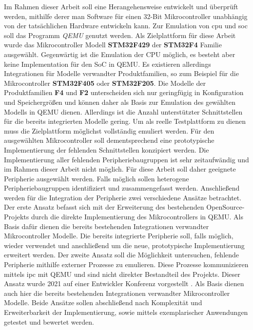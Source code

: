 Im Rahmen dieser Arbeit soll eine Herangehensweise entwickelt und überprüft
werden, mithilfe derer man Software für einen 32-Bit Mikrocontroller unabhängig
von der tatsächlichen Hardware entwickeln kann.
Zur Emulation von \acs{cpu} und \acs{soc} soll das Programm \textit{QEMU}
genutzt werden.
Als Zielplattform für diese Arbeit wurde das Mikrocontroller Modell
\textbf{STM32F429} der \textbf{STM32F4} Familie ausgewählt.
Gegenwärtig ist die Emulation der CPU möglich, es besteht aber keine
Implementation für den SoC in QEMU.
Es existieren allerdings Integrationen für Modelle verwandter Produktfamilien,
so zum Beispiel für die Mikrocontroller \textbf{STM32F405} oder
\textbf{STM32F205}\cite{QemuSTMDoku}.
Die Modelle der Produktfamilien \textbf{F4} und \textbf{F2} unterscheiden sich
nur geringfügig in Konfiguration und Speichergrößen und können daher als Basis
zur Emulation des gewählten Modells in QEMU dienen.
Allerdings ist die Anzahl unterstützter Schnittstellen für die bereits
integrierten Modelle gering.
Um als reelle Testplattform zu dienen muss die Zielplattform möglichst
vollständig emuliert werden.\newline
Für den ausgewählten Mikrocontroller soll dementsprechend eine prototypische
Implementierung der fehlenden Schnittstellen konzipiert werden.
Die Implementierung aller fehlenden Peripheriebaugruppen ist sehr zeitaufwändig
und im Rahmen dieser Arbeit nicht möglich.
Für diese Arbeit soll daher geeignete Peripherie ausgewählt werden.
Falls möglich sollen heterogene Peripheriebaugruppen identifiziert und
zusammengefasst werden.
Anschließend werden für die Integration der Peripherie zwei verschiedene
Ansätze betrachtet.\newline
Der erste Ansatz befasst sich mit der Erweiterung des bestehenden OpenSource-
Projekts durch die direkte Implementierung des Mikrocontrollers in QEMU.
Als Basis dafür dienen die bereits bestehenden Integrationen verwandter
Mikrocontroller Modelle.
Die bereits integrierte Peripherie soll, falls möglich, wieder verwendet und
anschließend um die neue, prototypische Implementierung erweitert
werden.\newline
Der zweite Ansatz soll die Möglichkeit untersuchen, fehlende Peripherie
mithilfe externer Prozesse zu emulieren.
Diese Prozesse kommunizieren mittels \acs{ipc} mit QEMU und sind
nicht direkter Bestandteil des Projekts.
Dieser Ansatz wurde 2021 auf einer Entwickler Konferenz vorgestellt
\cite{KplCodeDive}.
Als Basis dienen auch hier die bereits bestehenden Integrationen verwandter
Mikrocontroller Modelle.
Beide Ansätze sollen abschließend nach Komplexität und Erweiterbarkeit der
Implementierung, sowie mittels exemplarischer Anwendungen getestet und
bewertet werden.

